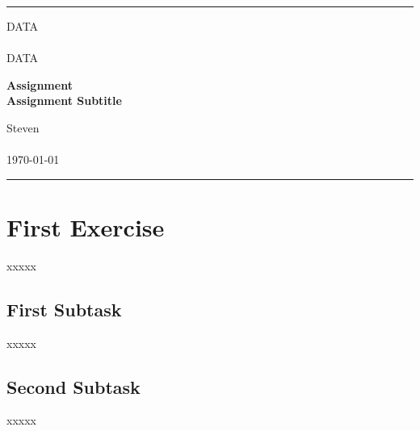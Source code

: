 \documentclass[a4paper, 11pt]{article} %
\begin{document}

\fancyhead[C]{}
\hrule \medskip %
\begin{minipage}{0.295\textwidth} %
	\raggedright
	DATA\\ %
	\footnotesize %
	\hfill\\
	DATA\\ %
\end{minipage}
\begin{minipage}{0.4\textwidth} %
	\centering
	\large %
	\textbf{Assignment}\\ %
	\normalsize %
	\textbf{Assignment Subtitle}\\ %
\end{minipage}
\begin{minipage}{0.295\textwidth} %
	\raggedleft
	Steven\\ %
	\footnotesize %
	\hfill\\
	\today\\ %
\end{minipage}
\medskip\hrule %
\bigskip


\section{First Exercise}
xxxxx

\subsection{First Subtask}
xxxxx

\subsection{Second Subtask}
xxxxx

\bigskip

\end{document}
